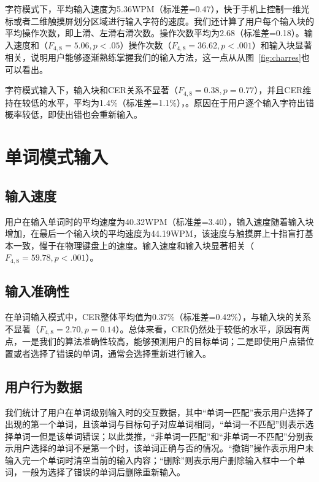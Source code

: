 字符模式下，平均输入速度为5.36WPM（标准差=0.47），快于手机上控制一维光标或者二维触摸屏划分区域进行输入字符的速度\cite{2018forceboard}\cite{1dhandwriting}。我们还计算了用户每个输入块的平均操作次数，即上滑、左滑右滑次数。操作次数平均为2.68（标准差=0.18）。输入速度和（$F_{4,8}=5.06, p < .05$）操作次数（$F_{4,8}=36.62, p < .001$）和输入块显著相关，说明用户能够逐渐熟练掌握我们的输入方法，这一点从从图~\ref{fig:charres}也可以看出。

字符模式输入下，输入块和CER关系不显著（$F_{4,8}=0.38, p =0.77$），并且CER维持在较低的水平，平均为1.4\%（标准差=1.1\%），。原因在于用户逐个输入字符出错概率较低，即使出错也会重新输入。

\section{单词模式输入}

\subsection{输入速度}
用户在输入单词时的平均速度为40.32WPM（标准差=3.40），输入速度随着输入块增加，在最后一个输入块的平均速度为44.19WPM，该速度与触摸屏上十指盲打基本一致\cite{2018shitoast}，慢于在物理键盘上的速度。输入速度和输入块显著相关（$F_{4,8}=59.78, p < .001$）。

\subsection{输入准确性}

在单词输入模式中，CER整体平均值为0.37\%（标准差=0.42\%），与输入块的关系不显著（$F_{4,8}=2.70, p =0.14$）。总体来看，CER仍然处于较低的水平，原因有两点，一是我们的算法准确性较高，能够预测用户的目标单词；二是即使用户点错位置或者选择了错误的单词，通常会选择重新进行输入。

\subsection{用户行为数据}
我们统计了用户在单词级别输入时的交互数据，其中“单词一匹配”表示用户选择了出现的第一个单词，且该单词与目标句子对应单词相同，“单词一不匹配”则表示选择单词一但是该单词错误；以此类推，“非单词一匹配”和“非单词一不匹配”分别表示用户选择的单词不是第一个时，该单词正确与否的情况。“撤销”操作表示用户未输入完一个单词时清空当前的输入内容；“删除”则表示用户删除输入框中一个单词，一般为选择了错误的单词后删除重新输入。

